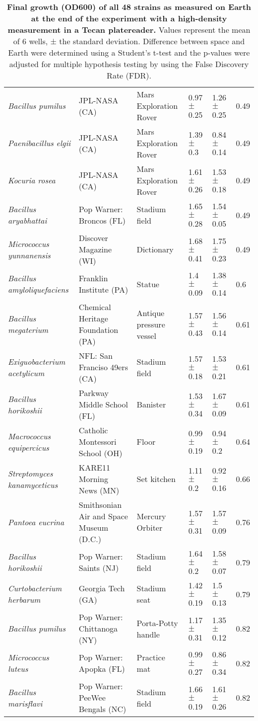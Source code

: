 \begin{table}[]
{\begin{tabular}{@{}llllll@{}}
\textit{Bacillus pumilus} & JPL-NASA (CA) & Mars Exploration Rover & 0.97 $\pm$ 0.25 & 1.26 $\pm$ 0.25 & 0.49 \\
\textit{Paenibacillus elgii} & JPL-NASA (CA) & Mars Exploration Rover & 1.39 $\pm$ 0.3 & 0.84 $\pm$ 0.14 & 0.49 \\
\textit{Kocuria rosea} & JPL-NASA (CA) & Mars Exploration Rover & 1.61 $\pm$ 0.26 & 1.53 $\pm$ 0.18 & 0.49 \\
\textit{Bacillus aryabhattai} & Pop Warner: Broncos (FL) & Stadium field & 1.65 $\pm$ 0.28 & 1.54 $\pm$ 0.05 & 0.49 \\
\textit{Micrococcus yunnanensis} & Discover Magazine (WI) & Dictionary & 1.68 $\pm$ 0.41 & 1.75 $\pm$ 0.23 & 0.49 \\
\textit{Bacillus amyloliquefaciens} & Franklin Institute (PA) & Statue & 1.4 $\pm$ 0.09 & 1.38 $\pm$ 0.14 & 0.6 \\
\textit{Bacillus megaterium} & Chemical Heritage Foundation (PA) & Antique pressure vessel & 1.57 $\pm$ 0.43 & 1.56 $\pm$ 0.14 & 0.61 \\
\textit{Exiguobacterium acetylicum} & NFL: San Franciso 49ers (CA) & Stadium field & 1.57 $\pm$ 0.18 & 1.53 $\pm$ 0.21 & 0.61 \\
\textit{Bacillus horikoshii} & Parkway Middle School (FL) & Banister & 1.53 $\pm$ 0.34 & 1.67 $\pm$ 0.09 & 0.61 \\
\textit{Macrococcus equipercicus} & Catholic Montessori School (OH) & Floor & 0.99 $\pm$ 0.19 & 0.94 $\pm$ 0.2 & 0.64 \\
\textit{Streptomyces kanamyceticus} & KARE11 Morning News (MN) & Set kitchen & 1.11 $\pm$ 0.2 & 0.92 $\pm$ 0.16 & 0.66 \\
\textit{Pantoea eucrina} & Smithsonian Air and Space Museum (D.C.) & Mercury Orbiter & 1.57 $\pm$ 0.31 & 1.57 $\pm$ 0.09 & 0.76 \\
\textit{Bacillus horikoshii} & Pop Warner: Saints (NJ) & Stadium field & 1.64 $\pm$ 0.2 & 1.58 $\pm$ 0.07 & 0.79 \\
\textit{Curtobacterium herbarum} & Georgia Tech (GA) & Stadium seat & 1.42 $\pm$ 0.19 & 1.5 $\pm$ 0.13 & 0.79 \\
\textit{Bacillus pumilus} & Pop Warner: Chittanoga (NY) & Porta-Potty handle & 1.17 $\pm$ 0.31 & 1.35 $\pm$ 0.12 & 0.82 \\
\textit{Micrococcus luteus} & Pop Warner: Apopka (FL) & Practice mat & 0.99 $\pm$ 0.27 & 0.86 $\pm$ 0.34 & 0.82 \\
\textit{Bacillus marisflavi} & Pop Warner: PeeWee Bengals (NC) & Stadium field & 1.66 $\pm$ 0.19 & 1.61 $\pm$ 0.26 & 0.82 \\ \bottomrule
\end{tabular}%
}
\caption{\textbf{Final growth (OD600) of all 48 strains as measured on Earth at the end of the experiment with a high-density measurement in a Tecan platereader.} Values represent the mean of 6 wells, ± the standard deviation. Difference between space and Earth were determined using a Student’s t-test and the p-values were adjusted for multiple hypothesis testing by using the False Discovery Rate (FDR).}
\label{SG_table1}
\end{table}